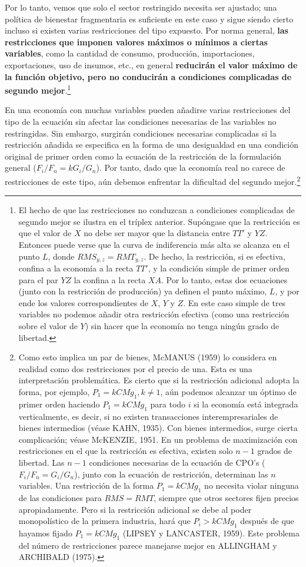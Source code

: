 \documentclass[10pt,a4paper]{article}
\begin{document}
Por lo tanto, vemos que solo el sector restringido necesita ser ajustado; una política de bienestar fragmentaria es suficiente en este caso y sigue siendo cierto incluso si existen varias restricciones del tipo expuesto. Por norma general, \textbf{las restricciones que imponen valores máximos o mínimos a ciertas variables}, como la cantidad de consumo, producción, importaciones, exportaciones, uso de insumos, etc., en general \textbf{reducirán el valor máximo de la función objetivo, pero no conducirán a condiciones complicadas de segundo mejor}.\footnote{%
    El hecho de que las restricciones no conduzcan a condiciones complicadas de segundo mejor se ilustra en el tríplex anterior. Supóngase que la restricción es que el valor de $X$ no debe ser mayor que la distancia entre $TT'$ y $YZ$. Entonces puede verse que la curva de indiferencia más alta se alcanza en el punto $L$, donde $RMS_{y,z} = RMT_{y,z}$. De hecho, la restricción, si es efectiva, confina a la economía a la recta $TT'$, y la condición simple de primer orden para el par $YZ$ la confina a la recta $XA$. Por lo tanto, estas dos ecuaciones (junto con la restricción de producción) ya definen el punto máximo, $L$, y por ende los valores correspondientes de $X$, $Y$ y $Z$. En este caso simple de tres variables no podemos añadir otra restricción efectiva (como una restricción sobre el valor de $Y$) sin hacer que la economía no tenga ningún grado de libertad.
}

En una economía con muchas variables pueden añadirse varias restricciones del tipo de la ecuación sin afectar las condiciones necesarias de las variables no restringidas. Sin embargo, surgirán condiciones necesarias complicadas si la restricción añadida se especifica en la forma de una desigualdad en una condición original de primer orden como la ecuación de la restricción de la formulación general ($F_i/F_n=kG_i/G_n$). Por tanto, dado que la economía real no carece de restricciones de este tipo, aún debemos enfrentar la dificultad del segundo mejor.\footnote{%
    Como esto implica un par de bienes, McMANUS (1959) lo considera en realidad como dos restricciones por el precio de una. Esta es una interpretación problemática. Es cierto que si la restricción adicional adopta la forma, por ejemplo, $P_1 = k{CMg}_1, k \neq 1$, aún podemos alcanzar un óptimo de primer orden haciendo $P_1 = k{CMg}_1$ para todo $i$ si la economía está integrada verticalmente, es decir, si no existen transacciones interempresariales de bienes intermedios (véase KAHN, 1935). Con bienes intermedios, surge cierta complicación; véase McKENZIE, 1951. En un problema de maximización con restricciones en el que la restricción es efectiva, existen solo $n-1$ grados de libertad. Las $n-1$ condiciones necesarias de la ecuación de CPO's ($F_i/F_n=G_i/G_n$), junto con la ecuación de restricción, determinan las $n$ variables. Una restricción de la forma $P_1 = k{CMg}_1$ no necesita violar ninguna de las condiciones para $RMS = RMT$, siempre que otros sectores fijen precios apropiadamente. Pero si la restricción adicional se debe al poder monopolístico de la primera industria, hará que $P_i > k{CMg}_1$ después de que hayamos fijado $P_1 = k{CMg}_1$ (LIPSEY y LANCASTER, 1959). Este problema del número de restricciones parece manejarse mejor en ALLINGHAM y ARCHIBALD (1975).
}
\end{document}
